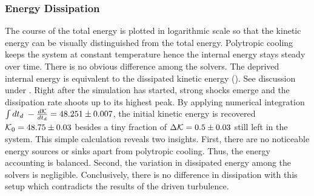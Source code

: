 
\subsubsection{Energy Dissipation}
\label{sec:decayturb-ekin-diss}
The course of the total energy  is plotted in
logarithmic scale so that the kinetic energy can be visually distinguished from
the total energy. Polytropic cooling keeps the system at constant temperature
hence the internal energy stays steady over time. There is no obvious
difference among the solvers.  The deprived internal energy is equivalent to
the dissipated kinetic energy (). See
discussion under . Right after the simulation has
started, strong shocks emerge and the dissipation rate shoots up to its highest
peak. By applying numerical integration
$\int dt_d \; -\frac{d\mathcal{K}}{dt_d} = 48.251 \pm 0.007$,  the initial kinetic
energy is recovered $\mathcal{K}_0 = 48.75 \pm 0.03$ besides a tiny fraction of
$\Delta \mathcal{K} = 0.5 \pm 0.03$ still left in the system. This simple calculation
reveals two insights. First, there are no noticeable energy sources or sinks
apart from  polytropic cooling. Thus, the energy accounting is balanced. Second,
the variation in dissipated energy among the solvers is negligible. Conclusively,
there is no difference in dissipation with this setup which contradicts the
results of the driven turbulence.


